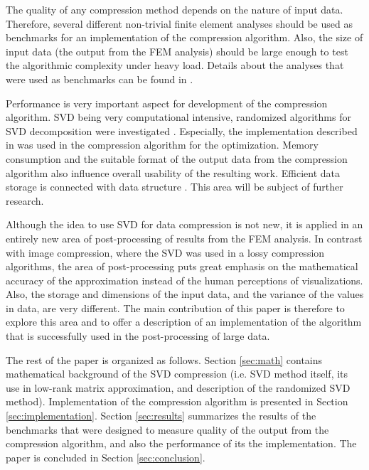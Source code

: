 The quality of any compression method depends on the nature of input data. Therefore, several different non-trivial finite element analyses should be used as benchmarks for an implementation of the compression algorithm. Also, the size of input data (the output from the FEM analysis) should be large enough to test the algorithmic complexity under heavy load. Details about the analyses that were used as benchmarks can be found in \cite{Kruis2012, Koudelka2009, Koudelka2006, Kruis2005}.

Performance is very important aspect for development of the compression algorithm. SVD being very computational intensive, randomized algorithms for SVD decomposition were investigated \cite{Candes2011, Woolfe2008, Martinsson2011, Szlam2014}. Especially, the implementation described in \cite{Halko2011} was used in the compression algorithm for the optimization. Memory consumption and the suitable format of the output data from the compression algorithm also influence overall usability of the resulting work. Efficient data storage is connected with data structure \cite{Ivanyi2012, Ivanyi2014}. This area will be subject of further research.

Although the idea to use SVD for data compression is not new, it is applied in an entirely new area of post-processing of results from the FEM analysis. In contrast with image compression, where the SVD was used in a lossy compression algorithms, the area of post-processing puts great emphasis on the mathematical accuracy of the approximation instead of the human perceptions of visualizations. Also, the storage and dimensions of the input data, and the variance of the values in data, are very different. The main contribution of this paper is therefore to explore this area and to offer a description of an implementation of the algorithm that is successfully used in the post-processing of large data.

The rest of the paper is organized as follows. Section \ref{sec:math} contains mathematical background of the SVD compression (i.e. SVD method itself, its use in low-rank matrix approximation, and description of the randomized SVD method). Implementation of the compression algorithm is presented in Section \ref{sec:implementation}. Section \ref{sec:results} summarizes the results of the benchmarks that were designed to measure quality of the output from the compression algorithm, and also the performance of its the implementation. The paper is concluded in Section \ref{sec:conclusion}.
